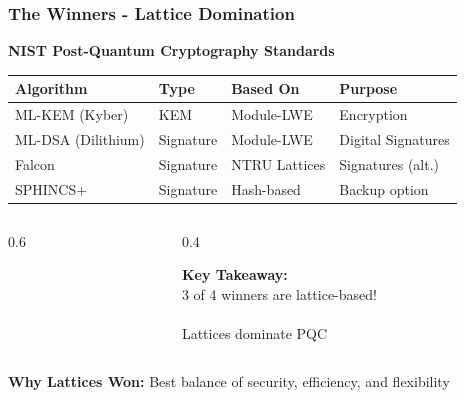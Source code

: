 \documentclass[aspectratio=169,10pt]{beamer}
\newcommand{\teaching}[1]{}
\newcommand{\slideheader}[1]{\frametitle{#1}}
\theoremstyle{plain}
\begin{document}
\begin{frame}
  \slideheader{The Winners - Lattice Domination}
  
  \begin{center}
    \textbf{\large NIST Post-Quantum Cryptography Standards}
  \end{center}
  
  \vspace{0.5cm}
  
  \begin{table}
    \centering
    \begin{tabular}{|l|l|l|l|}
      \hline
      \textbf{Algorithm} & \textbf{Type} & \textbf{Based On} & \textbf{Purpose} \\
      \hline
      \cellcolor{green!30}ML-KEM (Kyber) & KEM & Module-LWE & Encryption \\
      \cellcolor{green!30}ML-DSA (Dilithium) & Signature & Module-LWE & Digital Signatures \\
      \cellcolor{green!30}Falcon & Signature & NTRU Lattices & Signatures (alt.) \\
      \cellcolor{yellow!30}SPHINCS+ & Signature & Hash-based & Backup option \\
      \hline
    \end{tabular}
  \end{table}
  
  \vspace{0.5cm}
  
  \begin{columns}
    \begin{column}{0.6\textwidth}
    \end{column}
    
    \begin{column}{0.4\textwidth}
      \begin{redBox}
        \textbf{Key Takeaway:}\\
        3 of 4 winners are lattice-based!\\
        ~\\
        Lattices dominate PQC
      \end{redBox}
    \end{column}
  \end{columns}
  
  \vspace{0.3cm}
  
  \begin{greenBox}
    \textbf{Why Lattices Won:}
    Best balance of security, efficiency, and flexibility
  \end{greenBox}
  
  \teaching{Present the new standards landscape}
\end{frame}
\end{document}
